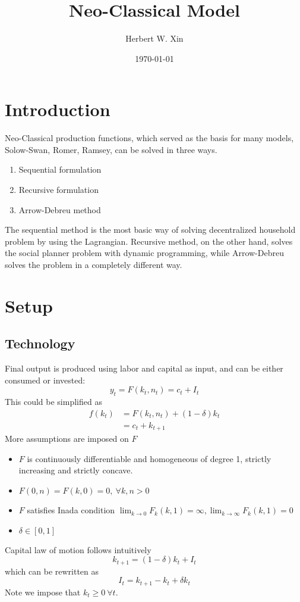 \documentclass[twocolumn, fleqn]{article}
\begin{document}
	\title{Neo-Classical Model}
	\author{Herbert W. Xin}
	\date{\today}
	\maketitle

	\tableofcontents
	\thispagestyle{fancy}
	
	\section{Introduction}
	Neo-Classical production functions, which served as the basis for many models, Solow-Swan, Romer, Ramsey, can be solved in three ways. 
	\begin{enumerate}
		\item Sequential formulation
		\item Recursive formulation
		\item Arrow-Debreu method
	\end{enumerate}
	The sequential method is the most basic way of solving decentralized household problem by using the Lagrangian. Recursive method, on the other hand, solves the social planner problem with dynamic programming, while Arrow-Debreu solves the problem in a completely different way.
	
	\section{Setup}
	\subsection{Technology}
	
	Final output is produced using labor and capital as input, and can be either consumed or invested:
	\[y_t=F(k_t, n_t)=c_t + I_t\]
	This could be simplified as 
	\begin{align*}
		f(k_t) &= F(k_t, n_t) + (1-\delta)k_t\\
		&= c_t + k_{t+1}
	\end{align*}
	More assumptions are imposed on $F$
	\begin{itemize}
		\item $F$ is continuously differentiable and homogeneous of degree 1, strictly increasing and strictly concave.
		\item $F(0,n) = F(k,0)=0, \ \forall k, n >0$
		\item $F$ satisfies Inada condition $\lim_{k \rightarrow 0} F_k (k,1) = \infty, \lim_{k \rightarrow \infty} F_k (k,1) = 0$
		\item $\delta \in [0,1]$
	\end{itemize}
	Capital law of motion follows intuitively
	\[k_{t+1} = (1-\delta)k_t + I_t\]
	which can be rewritten as 
	\[I_t = k_{t+1} - k_t + \delta k_t\]
	Note we impose that $k_{t}\geq 0 \ \forall t$.
	
\end{document}
